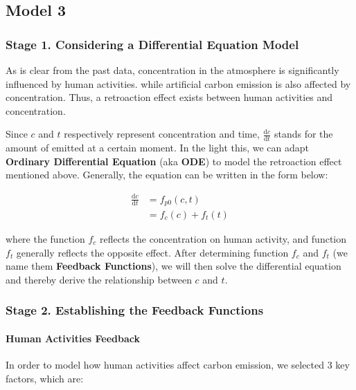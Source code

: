 \documentclass[12pt]{article}
\begin{document}
\subsection{Model 3}
\label{m3}

\subsubsection{Stage 1. Considering a Differential Equation Model}

As is clear from the past data,  concentration in the atmosphere is significantly influenced by human activities. while artificial carbon emission is also affected by  concentration. Thus, a retroaction effect exists between human activities and  concentration.

Since $c$ and $t$ respectively represent  concentration and time, $\frac{\mathrm{d}c}{\mathrm{d}t}$ stands for the amount of  emitted at a certain moment. In the light this, we can adapt \textbf{Ordinary Differential Equation} (aka \textbf{ODE}) to model the retroaction effect mentioned above. Generally, the equation can be written in the form below:

\begin{align}
    \label{ODE:big}
    \frac{\mathrm{d}c}{\mathrm{d}t} & = f_{p0}(c, t)\\
    & = f_c(c) + f_t(t)
\end{align}

where the function $f_c$ reflects the  concentration on human activity, and function $f_t$ generally reflects the opposite effect. After determining function $f_c$ and $f_t$ (we name them \textbf{Feedback Functions}), we will then solve the differential equation and thereby derive the relationship between $c$ and $t$. 

\subsubsection{Stage 2. Establishing the Feedback Functions}

\paragraph{Human Activities Feedback}
In order to model how human activities affect carbon emission, we selected 3 key factors, which are:
\end{document}
